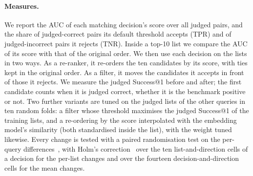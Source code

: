 \paragraph{Measures.}
We report the AUC of each matching decision's score over all judged pairs, and the share of judged-correct pairs its default threshold accepts (TPR) and of judged-incorrect pairs it rejects (TNR). Inside a top-10 list we compare the AUC of its score with that of the original order. We then use each decision on the lists in two ways. As a re-ranker, it re-orders the ten candidates by its score, with ties kept in the original order. As a filter, it moves the candidates it accepts in front of those it rejects. We measure the judged Success@1 before and after; the first candidate counts when it is judged correct, whether it is the benchmark positive or not. Two further variants are tuned on the judged lists of the other queries in ten random folds: a filter whose threshold maximises the judged Success@1 of the training lists, and a re-ordering by the score interpolated with the embedding model's similarity (both standardised inside the list), with the weight tuned likewise. Every change is tested with a paired randomisation test on the per-query differences~\cite{smucker2007comparison}, with Holm's correction~\cite{holm1979simple} over the ten list-and-direction cells of a decision for the per-list changes and over the fourteen decision-and-direction cells for the mean changes.
